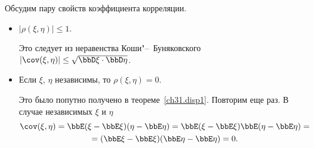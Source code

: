 Обсудим пару свойств коэффициента корреляции.
\begin{itemize}
\item 
$|\rho(\xi,\eta)|\le1$.

Это следует из неравенства Коши"--~Буняковского $|\cov(\xi,\eta)| \le \sqrt{\bbD\xi\cdot \bbD\eta}$.
\item
Если $\xi$, $\eta$ независимы, то $\rho(\xi,\eta)=0$.

Это было попутно получено в теореме~\ref{ch31.disp1}. Повторим еще раз. В случае независимых $\xi$ и $\eta$
\begin{multline*}
\cov(\xi,\eta)=\bbE(\xi - \bbE\xi)(\eta - \bbE\eta) = \bbE(\xi - \bbE\xi)\bbE(\eta - \bbE\eta)=\\ = (\bbE\xi - \bbE\xi)(\bbE\eta - \bbE\eta) = 0.
\end{multline*}
\end{itemize}

